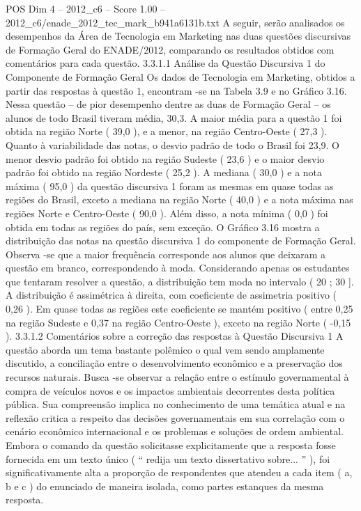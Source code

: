 \begin{textsample}{POS Dim 4 – 2012\_c6 – Score 1.00 – 2012\_c6/enade\_2012\_tec\_mark\_b941a6131b.txt}
A seguir, serão analisados os desempenhos da Área de Tecnologia em Marketing nas duas questões discursivas de Formação Geral do ENADE/2012, comparando os resultados obtidos com comentários para cada questão. 3.3.1.1 Análise da Questão Discursiva 1 do Componente de Formação Geral Os dados de Tecnologia em Marketing, obtidos a partir das respostas à questão 1, encontram -se na Tabela 3.9 e no Gráfico 3.16.
Nessa questão – de pior desempenho dentre as duas de Formação Geral – os alunos de todo Brasil tiveram média, 30,3.
A maior média para a questão 1 foi obtida na região Norte ( 39,0 ), e a menor, na região Centro-Oeste ( 27,3 ).
Quanto à variabilidade das notas, o desvio padrão de todo o Brasil foi 23,9.
O menor desvio padrão foi obtido na região Sudeste ( 23,6 ) e o maior desvio padrão foi obtido na região Nordeste ( 25,2 ).
A mediana ( 30,0 ) e a nota máxima ( 95,0 ) da questão discursiva 1 foram as mesmas em quase todas as regiões do Brasil, exceto a mediana na região Norte ( 40,0 ) e a nota máxima nas regiões Norte e Centro-Oeste ( 90,0 ).
Além disso, a nota mínima ( 0,0 ) foi obtida em todas as regiões do país, sem exceção.
O Gráfico 3.16 mostra a distribuição das notas na questão discursiva 1 do componente de Formação Geral.
Observa -se que a maior frequência corresponde aos alunos que deixaram a questão em branco, correspondendo à moda.
Considerando apenas os estudantes que tentaram resolver a questão, a distribuição tem moda no intervalo ( 20 ; 30 ].
A distribuição é assimétrica à direita, com coeficiente de assimetria positivo ( 0,26 ).
Em quase todas as regiões este coeficiente se mantém positivo ( entre 0,25 na região Sudeste e 0,37 na região Centro-Oeste ), exceto na região Norte ( -0,15 ). 3.3.1.2 Comentários sobre a correção das respostas à Questão Discursiva 1 A questão aborda um tema bastante polêmico o qual vem sendo amplamente discutido, a conciliação entre o desenvolvimento econômico e a preservação dos recursos naturais.
Busca -se observar a relação entre o estímulo governamental à compra de veículos novos e os impactos ambientais decorrentes desta política pública.
Sua compreensão implica no conhecimento de uma temática atual e na reflexão critica a respeito das decisões governamentais em sua correlação com o cenário econômico internacional e os problemas e soluções de ordem ambiental.
Embora o comando da questão solicitasse explicitamente que a resposta fosse fornecida em um texto único ( “ redija um texto dissertativo sobre... ” ), foi significativamente alta a proporção de respondentes que atendeu a cada item ( a, b e c ) do enunciado de maneira isolada, como partes estanques da mesma resposta.

\end{textsample}
